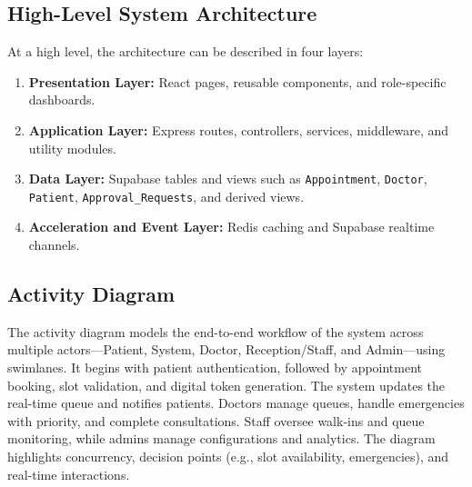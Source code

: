 \documentclass[12pt,onecolumn]{IEEEtran}
\begin{document}
\subsection{High-Level System Architecture}
At a high level, the architecture can be described in four layers:
\begin{enumerate}
    \item \textbf{Presentation Layer:} React pages, reusable components, and role-specific dashboards.
    \item \textbf{Application Layer:} Express routes, controllers, services, middleware, and utility modules.
    \item \textbf{Data Layer:} Supabase tables and views such as \texttt{Appointment}, \texttt{Doctor}, \texttt{Patient}, \texttt{Approval\_Requests}, and derived views.
    \item \textbf{Acceleration and Event Layer:} Redis caching and Supabase realtime channels.
\end{enumerate}

\begin{center}
\end{center}

\subsection{Activity Diagram}
The activity diagram models the end-to-end workflow of the system across multiple actors—Patient, System, Doctor, Reception/Staff, and Admin—using swimlanes. It begins with patient authentication, followed by appointment booking, slot validation, and digital token generation. The system updates the real-time queue and notifies patients. Doctors manage queues, handle emergencies with priority, and complete consultations. Staff oversee walk-ins and queue monitoring, while admins manage configurations and analytics. The diagram highlights concurrency, decision points (e.g., slot availability, emergencies), and real-time interactions.
\end{document}
